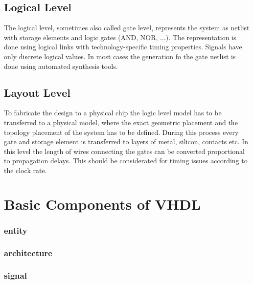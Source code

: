 \subsection{Logical Level}
The logical level, sometimes also called gate level, represents the system as netlist with storage elements and logic gates (AND, NOR, ...). The representation is done using logical links with technology-specific timing properties. Signals have only discrete logical values. In most cases the generation fo the gate netlist is done using automated synthesis tools.
\subsection{Layout Level}
To fabricate the design to a physical chip the logic level model has to be transferred to a physical model, where the exact geometric placement and the topology placement of the system has to be defined. During this process every gate and storage element is transferred to layers of metal, silicon, contacts etc.\cite{Cey96} In this level the length of wires connecting the gates can be converted proportional to propagation delays. This should be considerated for timing issues according to the clock rate.
\section{Basic Components of VHDL}

\subsubsection{entity}
\subsubsection{architecture}
\subsubsection{signal}